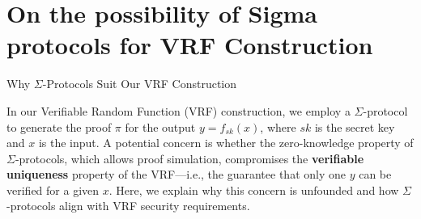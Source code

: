     
    
    
    










\section{On the possibility of Sigma protocols for VRF Construction}
Why $\Sigma$-Protocols Suit Our VRF Construction

In our Verifiable Random Function (VRF) construction, we employ a $\Sigma$-protocol to generate the proof $\pi$ for the output $y = f_{sk}(x)$, where $sk$ is the secret key and $x$ is the input. A potential concern is whether the zero-knowledge property of $\Sigma$-protocols, which allows proof simulation, compromises the \textbf{verifiable uniqueness} property of the VRF—i.e., the guarantee that only one $y$ can be verified for a given $x$. Here, we explain why this concern is unfounded and how $\Sigma$-protocols align with VRF security requirements.

